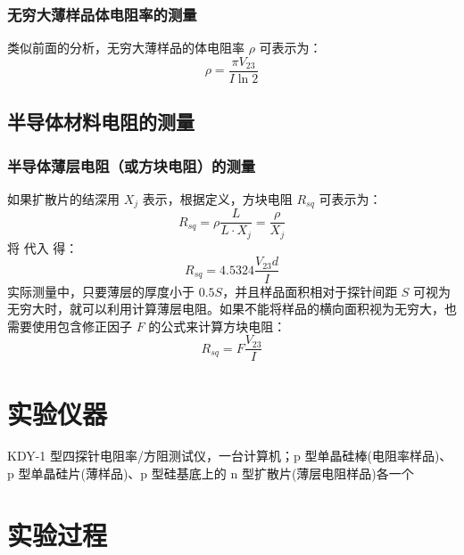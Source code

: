 \documentclass[a4paper,utf8]{article}
\begin{document}
        \subsubsection{无穷大薄样品体电阻率的测量}
            类似前面的分析，无穷大薄样品的体电阻率 $\rho$ 可表示为：
            \begin{equation}
                \rho =\frac{\pi V_{23}}{I \ln 2} \label{eq:1}
            \end{equation}
    \subsection{半导体材料电阻的测量}        
        \subsubsection{半导体薄层电阻（或方块电阻）的测量}
            如果扩散片的结深用 $X_j$ 表示，根据定义，方块电阻 $R_{sq}$ 可表示为：
            \begin{equation}
                R_{sq}=\rho\frac{L}{L\cdot X_{j}}=\frac{\rho}{X_{j}} \label{eq:2}
            \end{equation}
            将  代入  得：
            \begin{equation}
                R_{sq}=4.5324\frac{V_{23} d}{I} \label{eq:3}
            \end{equation}
            实际测量中，只要薄层的厚度小于 $0.5S$，并且样品面积相对于探针间距 $S$ 可视为无穷大时，就可以利用计算薄层电阻。如果不能将样品的横向面积视为无穷大，也需要使用包含修正因子 $F$ 的公式来计算方块电阻：
            \begin{equation}
                R_{sq}= F \frac{V_{23}}{I} \label{eq:4}
            \end{equation}
        
\section{实验仪器}%
    KDY-1 型四探针电阻率/方阻测试仪，一台计算机；p 型单晶硅棒(电阻率样品)、p 型单晶硅片(薄样品)、p 型硅基底上的 n 型扩散片(薄层电阻样品)各一个
\section{实验过程}%
\end{document}

